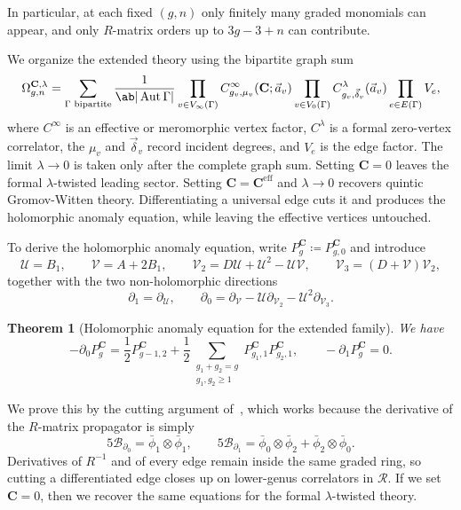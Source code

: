 \documentclass{amsart}
\newtheorem{thm}{Theorem}[section]
\theoremstyle{definition}
\theoremstyle{remark}
\theoremstyle{plain}
\theoremstyle{definition}
\theoremstyle{remark}
\newcommand{\g}{\mathfrak{g}}
\newcommand{\mc}[1]{\mathcal{#1}}
\newcommand{\mbf}[1]{\mathbf{#1}}
\newcommand{\mr}[1]{\mathrm{#1}}
\newcommand{\1}{\mathbf{1}}
\newcommand{\2}{\mathbf{2}}
\newcommand{\3}{\mathbf{3}}
\DeclareMathOperator{\Aut}{Aut}
\begin{document}
In particular, at each fixed \((g,n)\) only finitely many graded monomials can appear, and only \(R\)-matrix orders up to \(3g-3+n\) can contribute.

We organize the extended theory using the bipartite graph sum
\[ \Omega^{\mbf{C},\lambda}_{g,n} = \sum_{\Gamma \text{ bipartite}} \frac{1}{\ab|\Aut\Gamma|}\prod_{v\in V_{\infty}(\Gamma)} C^{\infty}_{g_v,\mu_v}(\mbf{C};\vec{a}_v) \prod_{v \in V_0(\Gamma)}C^{\lambda}_{g_v,\vec{\delta}_v}(\vec{a}_v)\prod_{e \in E(\Gamma)}V_e, \]
where \(C^{\infty}\) is an effective or meromorphic vertex factor, \(C^{\lambda}\) is a formal zero-vertex correlator, the \(\mu_v\) and \(\vec{\delta}_v\) record incident degrees, and \(V_e\) is the edge factor. The limit \(\lambda \to 0\) is taken only after the complete graph sum. Setting \(\mbf{C}=0\) leaves the formal \(\lambda\)-twisted leading sector. Setting \(\mbf{C}=\mbf{C}^{\mr{eff}}\) and \(\lambda\to0\) recovers quintic Gromov-Witten theory. Differentiating a universal edge cuts it and produces the holomorphic anomaly equation, while leaving the effective vertices untouched.

To derive the holomorphic anomaly equation, write \(P^{\mbf{C}}_g \coloneqq P^{\mbf{C}}_{g,0}\) and introduce
\[ \mc{U} = B_1, \qquad \mc{V} = A + 2B_1, \qquad \mc{V}_2 = D\mc{U} + \mc{U}^2 - \mc{U}\mc{V}, \qquad \mc{V}_3 = (D+\mc{V})\mc{V}_2, \]
together with the two non-holomorphic directions
\[ \partial_1 = \partial_{\mc{U}}, \qquad \partial_0 = \partial_{\mc{V}} - \mc{U}\partial_{\mc{V}_2} - \mc{U}^2\partial_{\mc{V}_3}. \]

\begin{thm}[Holomorphic anomaly equation for the extended family]
    We have
    \[ -\partial_0 P^{\mbf{C}}_g = \frac{1}{2}P^{\mbf{C}}_{g-1,2} + \frac{1}{2}\sum_{\substack{g_1+g_2=g\\g_1,g_2\geq1}}P^{\mbf{C}}_{g_1,1}P^{\mbf{C}}_{g_2,1}, \qquad -\partial_1 P^{\mbf{C}}_g = 0. \]
\end{thm}

We prove this by the cutting argument of~, which works because the derivative of the \(R\)-matrix propagator is simply
\[ 5\mc{B}_{\partial_0} = \bar{\phi}_1 \otimes \bar{\phi}_1, \qquad 5\mc{B}_{\partial_1} = \bar{\phi}_0\otimes\bar{\phi}_2 + \bar{\phi}_2\otimes\bar{\phi}_0. \]
Derivatives of \(R^{-1}\) and of every edge remain inside the same graded ring, so cutting a differentiated edge closes up on lower-genus correlators in \(\mc{R}\). If we set \(\mbf{C}=0\), then we recover the same equations for the formal \(\lambda\)-twisted theory.
\end{document}
